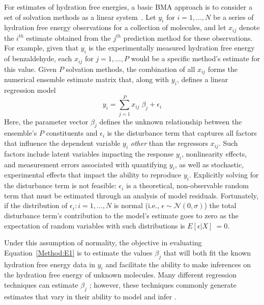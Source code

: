 \documentclass[journal=jpcbfk, manuscript=article]{achemso}
\newcommand{\+}[1]{\ensuremath{\mathbf{#1}}}
\begin{document}
For estimates of hydration free energies, a basic BMA approach is to consider a set of solvation methods as a linear system~\cite{Hoeting:1999,Raftery:1998,Raftery:1995}.  
Let $y_i$ for $i = 1, \ldots, N$ be a series of hydration free energy observations for a collection of molecules, and let $x_{i j}$ denote the $i^{th}$ estimate obtained from the $j^{th}$ prediction method for these observations. 
For example, given that $y_i$ is the experimentally measured hydration free energy of benzaldehyde, each $x_{i j}$ for $j = 1, \ldots, P$ would be a specific method's estimate for this value.  
Given $P$ solvation methods, the combination of all $x_{ij}$ forms the numerical ensemble estimate matrix that, along with $y_i$, defines a linear regression model 
\begin{equation}
	\label{Method:E1}
	y_i = \sum_{j=1}^P x_{ij} \;\beta_j + \epsilon_i
\end{equation}
Here, the parameter vector $\beta_j$ defines the unknown relationship between the ensemble's $P$ constituents and $\epsilon_i$ is the disturbance term that captures all factors that influence the dependent variable $y_i$ \emph{other} than the regressors $x_{ij}$.
Such factors include latent variables impacting the response $y_i$, nonlinearity effects, and measurement errors associated with quantifying $y_i$, as well as stochastic, experimental effects that impact the ability to reproduce $y_i$.  
Explicitly solving for the disturbance term is not feasible: $\epsilon_i$ is a theoretical, non-observable random term that must be estimated through an analysis of model residuals.  
Fortunately, if the distribution of $\epsilon_i: i=1,\ldots,N$ is normal (i.e., $\epsilon \sim \mathcal{N}(0,\sigma)$) the total disturbance term's contribution to the model's estimate goes to zero as the expectation of random variables with such distributions is $E [\epsilon | X]\ = 0$.

Under this assumption of normality, the objective in evaluating Equation~\ref{Method:E1} is to estimate the values $\beta_j$ that will both fit the known hydration free energy data in $y_i$ and facilitate the ability to make inferences on the hydration free energy of unknown molecules.  
Many different regression techniques can estimate $\beta_j$ \cite{Hosmer:1989,Reiss:2012,Mallows:1973,Candes:2007}; however, these techniques commonly generate estimates that vary in their ability to model and infer \cite{Genell:2010,Hoeting:1999,Davidson:2006,Raftery:1995,Raftery:1998}.  
\end{document}
